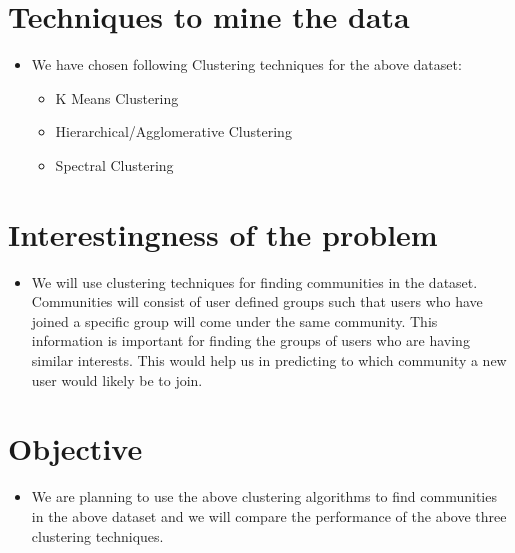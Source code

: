 \documentclass[11pt]{exam}
\begin{document}
\section{Techniques to mine the data}

\begin{itemize}

\item[] We have chosen following Clustering techniques for the above dataset:
	
\begin{itemize}
	\item K Means Clustering
	\item Hierarchical/Agglomerative Clustering 
	\item Spectral Clustering
\end{itemize}

\end{itemize}
\section{Interestingness of the problem}

\begin{itemize}

\item[]  We will use clustering techniques for finding communities in the dataset. Communities will consist of user defined groups such that users who have joined a specific group will come under the same community. This information is important for finding the groups of users who are having similar interests. This would help us in predicting to which community a new user would likely be to join. \\


\end{itemize}


\section{Objective}

\begin{itemize}

\item[] We are planning to use the above clustering algorithms to find communities in the above dataset and we will compare the performance of the above three clustering techniques.
\end{itemize}
\end{document}
